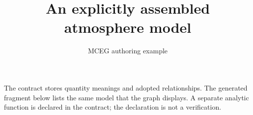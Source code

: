 \documentclass{article}
\begin{document}
\title{An explicitly assembled atmosphere model}
\author{MCEG authoring example}
\date{}
\maketitle
The contract stores quantity meanings and adopted relationships. The generated
fragment below lists the same model that the graph displays. A separate analytic
function is declared in the contract; the declaration is not a verification.

\end{document}
